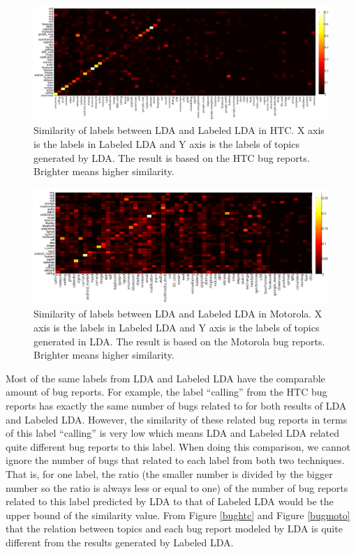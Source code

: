 \documentclass[10pt, conference, compsocconf]{IEEEtran}
\begin{document}
\begin{figure}[htb]
\centering
\includegraphics[width=1\textwidth]{htcsim.png}
\caption{Similarity of labels between LDA and Labeled LDA in HTC. X axis is the labels in Labeled LDA and Y axis is the labels of topics generated by LDA. The result is based on the HTC bug reports. Brighter means higher similarity.}
\label{similarityhtc}
\end{figure}

\begin{figure}[htb]
\centering
\includegraphics[width=1\textwidth]{motosim.png}
\caption{Similarity of labels between LDA and Labeled LDA in Motorola. X axis is the labels in Labeled LDA and Y axis is the labels of topics generated in LDA. The result is based on the Motorola bug reports. Brighter means higher similarity.}
\label{similaritymoto}
\end{figure}

Most of the same labels from LDA and Labeled LDA have the comparable amount of bug reports. For example, the label ``calling'' from the HTC bug reports has exactly the same number of bugs related to for both results of LDA and Labeled LDA. However, the similarity of these related bug reports in terms of this label ``calling'' is very low which means LDA and Labeled LDA related quite different bug reports to this label. When doing this comparison, we cannot ignore the number of bugs that related to each label from both two techniques. That is, for one label, the ratio (the smaller number is divided by the bigger number so the ratio is always less or equal to one) of the number of bug reports related to this label predicted by LDA to that of Labeled LDA would be the upper bound of the similarity value. From Figure \ref{bughtc} and Figure \ref{bugmoto} that the relation between topics and each bug report modeled by LDA is quite different from the results generated by Labeled LDA.
\end{document}
